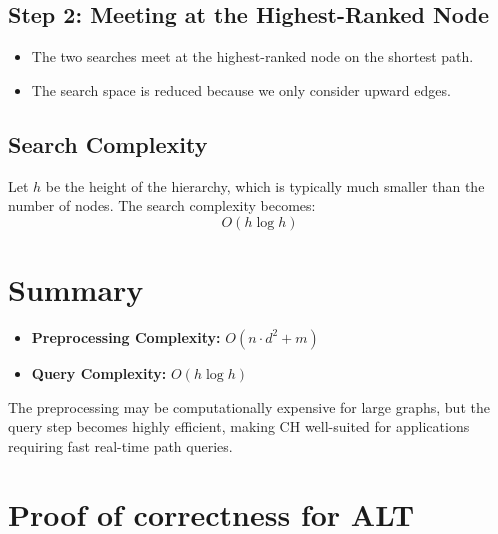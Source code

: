 \begin{appendices}
	\subsection*{Step 2: Meeting at the Highest-Ranked Node}
	\begin{itemize}
		\item The two searches meet at the highest-ranked node on the shortest path.
		\item The search space is reduced because we only consider upward edges.
	\end{itemize}
	
	\subsection*{Search Complexity}
	Let \(h\) be the height of the hierarchy, which is typically much smaller than the number of nodes. The search complexity becomes:
	\[
	O(h \log h)
	\]
	
	\section*{Summary}
	\begin{itemize}
		\item \textbf{Preprocessing Complexity:} \(O(n \cdot d^2 + m)\)
		\item \textbf{Query Complexity:} \(O(h \log h)\)
	\end{itemize}
	
	The preprocessing may be computationally expensive for large graphs, but the query step becomes highly efficient, making CH well-suited for applications requiring fast real-time path queries.

\section{Proof of correctness for ALT}\label{appendix:ALT:correctness}


\end{appendices}
